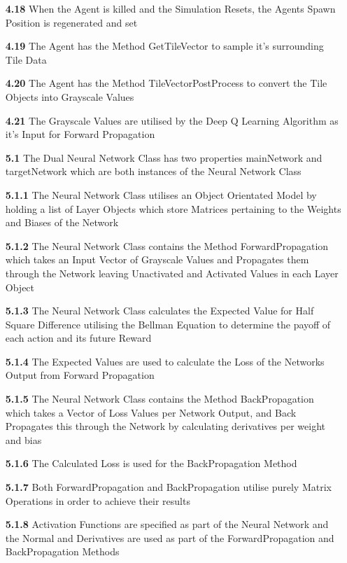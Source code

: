 \begin{flushleft}
\begin{itemize}
            \item[\textbf{4.18}] When the Agent is killed and the Simulation Resets, the Agents Spawn Position is regenerated and set
            \item[\textbf{4.19}] The Agent has the Method \textsf{GetTileVector} to sample it's surrounding Tile Data
            \item[\textbf{4.20}] The Agent has the Method \textsf{TileVectorPostProcess} to convert the Tile Objects into Grayscale Values
            \item[\textbf{4.21}] The Grayscale Values are utilised by the Deep Q Learning Algorithm as it's Input for Forward Propagation
            \item[\textbf{5.1}] The Dual Neural Network Class has two properties \textsf{mainNetwork} and \textsf{targetNetwork} which are both instances of the Neural Network Class
            \item[\textbf{5.1.1}] The Neural Network Class utilises an Object Orientated Model by holding a list of Layer Objects which store Matrices pertaining to the Weights and Biases of the Network
            \item[\textbf{5.1.2}] The Neural Network Class contains the Method \textsf{ForwardPropagation} which takes an Input Vector of Grayscale Values and Propagates them through the Network leaving Unactivated and Activated Values in each Layer Object
            \item[\textbf{5.1.3}] The Neural Network Class calculates the Expected Value for Half Square Difference utilising the Bellman Equation to determine the payoff of each action and its future Reward
            \item[\textbf{5.1.4}] The Expected Values are used to calculate the Loss of the Networks Output from Forward Propagation
            \item[\textbf{5.1.5}] The Neural Network Class contains the Method \textsf{BackPropagation} which takes a Vector of Loss Values per Network Output, and Back Propagates this through the Network by calculating derivatives per weight and bias
            \item[\textbf{5.1.6}] The Calculated Loss is used for the \textsf{BackPropagation} Method
            \item[\textbf{5.1.7}] Both \textsf{ForwardPropagation} and \textsf{BackPropagation} utilise purely Matrix Operations in order to achieve their results
            \item[\textbf{5.1.8}] Activation Functions are specified as part of the Neural Network and the Normal and Derivatives are used as part of the \textsf{ForwardPropagation} and \textsf{BackPropagation} Methods

\end{itemize}
\end{flushleft}

